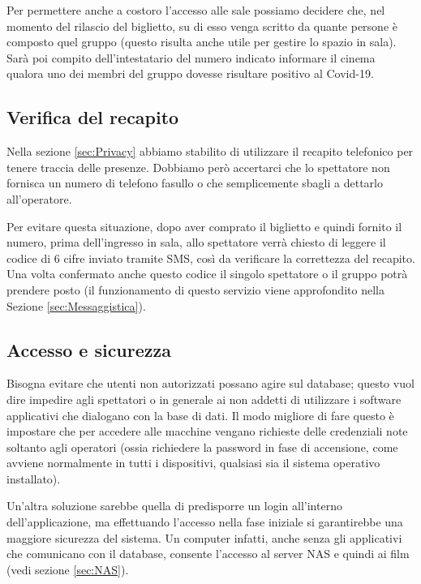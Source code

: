 \documentclass{article}
\begin{document}
Per permettere anche a costoro l'accesso alle sale possiamo decidere che, nel momento del rilascio del biglietto, su di esso venga scritto da quante persone è composto quel gruppo (questo risulta anche utile per gestire lo spazio in sala). Sarà poi compito dell'intestatario del numero indicato informare il cinema qualora uno dei membri del gruppo dovesse risultare positivo al Covid-19.

\subsection{Verifica del recapito}\label{sec:Sicurezza}

Nella sezione \ref{sec:Privacy} abbiamo stabilito di utilizzare il recapito telefonico per tenere traccia delle presenze. Dobbiamo però accertarci che lo spettatore non fornisca un numero di telefono fasullo o che semplicemente sbagli a dettarlo all'operatore.

Per evitare questa situazione, dopo aver comprato il biglietto e quindi fornito il numero, prima dell'ingresso in sala, allo spettatore verrà chiesto di leggere il codice di 6 cifre inviato tramite SMS, così da verificare la correttezza del recapito. Una volta confermato anche questo codice il singolo spettatore o il gruppo potrà prendere posto (il funzionamento di questo servizio viene approfondito nella Sezione \ref{sec:Messaggistica}).

\subsection{Accesso e sicurezza}\label{sec:Login}

Bisogna evitare che utenti non autorizzati possano agire sul database; questo vuol dire impedire agli spettatori o in generale ai non addetti di utilizzare i software applicativi che dialogano con la base di dati. Il modo migliore di fare questo è impostare che per accedere alle macchine vengano richieste delle credenziali note soltanto agli operatori (ossia richiedere la password in fase di accensione, come avviene normalmente in tutti i dispositivi, qualsiasi sia il sistema operativo installato).

Un'altra soluzione sarebbe quella di predisporre un login all'interno dell'applicazione, ma effettuando l'accesso nella fase iniziale si garantirebbe una maggiore sicurezza del sistema. Un computer infatti, anche senza gli applicativi che comunicano con il database, consente l'accesso al server NAS e quindi ai film (vedi sezione \ref{sec:NAS}).
\end{document}
